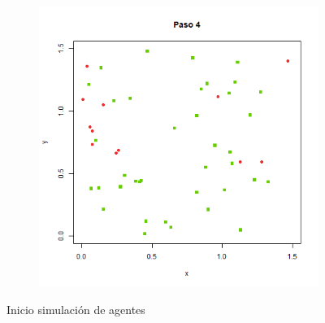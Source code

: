 \documentclass[a4paper]{article}
\begin{document}
\begin{figure}[h!]
\begin{subfigure}[b]{0.45\linewidth}
\caption{}
\label{q6}
\end{subfigure}
\begin{subfigure}[b]{0.45\linewidth}
\includegraphics[width=\linewidth]{reto2,4.png}
\caption{}
\label{q7}
\end{subfigure}
\caption{Inicio simulación de agentes}
    \label{qw}
\end{figure}
\end{document}
